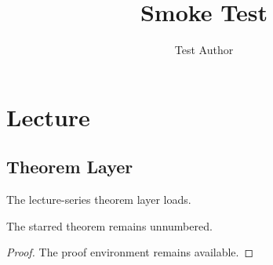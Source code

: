 \documentclass[final]{cslectureseries}
\title{Smoke Test}
\author{Test Author}
\begin{document}
\maketitle
\chapter{Lecture}
\section{Theorem Layer}
\begin{theorem}The lecture-series theorem layer loads.\end{theorem}
\begin{theorem*}The starred theorem remains unnumbered.\end{theorem*}
\begin{proof}The proof environment remains available.\end{proof}
\end{document}
